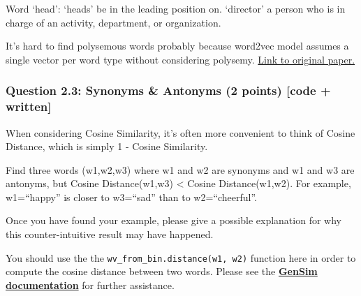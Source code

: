 \documentclass[11pt]{article}
\begin{document}
    Word `head': `heads' be in the leading position on. `director' a person
who is in charge of an activity, department, or organization.

It's hard to find polysemous words probably because word2vec model
assumes a single vector per word type without considering polysemy.
\href{http://www.aclweb.org/anthology/C16-1073}{Link to original paper.}

    \hypertarget{question-2.3-synonyms-antonyms-2-points-code-written}{%
\subsubsection{Question 2.3: Synonyms \& Antonyms (2 points) {[}code +
written{]}}\label{question-2.3-synonyms-antonyms-2-points-code-written}}

When considering Cosine Similarity, it's often more convenient to think
of Cosine Distance, which is simply 1 - Cosine Similarity.

Find three words (w1,w2,w3) where w1 and w2 are synonyms and w1 and w3
are antonyms, but Cosine Distance(w1,w3) \textless{} Cosine
Distance(w1,w2). For example, w1=``happy'' is closer to w3=``sad'' than
to w2=``cheerful''.

Once you have found your example, please give a possible explanation for
why this counter-intuitive result may have happened.

You should use the the \texttt{wv\_from\_bin.distance(w1,\ w2)} function
here in order to compute the cosine distance between two words. Please
see the
\textbf{\href{https://radimrehurek.com/gensim/models/keyedvectors.html\#gensim.models.keyedvectors.FastTextKeyedVectors.distance}{GenSim
documentation}} for further assistance.
\end{document}
